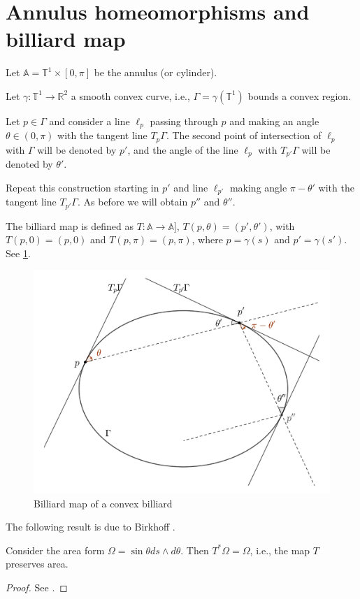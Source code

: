 \section{Annulus homeomorphisms and billiard map}

Let $\mathbb{ A}=\mathbb{T}^1\times [0,\pi]$ be the annulus (or cylinder).

Let $\gamma:\mathbb{T}^1\to\mathbb{R}^2$ a smooth convex curve, i.e., $\Gamma=\gamma(\mathbb{T}^1)$ bounds a convex region. 

 

Let $p\in \Gamma$ and consider a line $\ell_p$ passing through $p$ and making an angle $\theta\in (0,\pi)$ with the tangent line $T_p\Gamma$. The second point of intersection of $\ell_p$ with $\Gamma$ will be denoted by $p'$, and the angle of the line $\ell_p$  with $T_{p'}\Gamma$ will be denoted by $\theta'$.

Repeat this construction starting in $p'$ and   line $\ell_{p'}$ making angle $\pi-\theta'$ with the tangent line $T_{p'}\Gamma$. As before we will obtain $p''$ and $\theta''$. 

The billiard map is defined as
$T:\mathbb{A} \to\mathbb{A}]$,  $T(p,\theta)= (p',\theta')$, with $T(p,0)=(p,0)$ and $T(p,\pi)=(p,\pi)$, where $p=\gamma(s)$ and $p'=\gamma(s')$. See \cref{fig:appC-billiard-map}.
\begin{figure}
    \centering
    \includegraphics[scale=0.4]{zappC/pics/pics_appC_160bilharmapanel.pdf}
    \caption{Billiard map of a convex billiard}
    \label{fig:appC-billiard-map}
\end{figure}

The following result is due to Birkhoff \cite{birkhoff1922}.

\begin{theorem} Consider the area form $\Omega=\sin\theta ds\wedge d\theta$. Then $T^{*}\Omega=\Omega$, i.e., the map $T$ preserves area.
\end{theorem}

\begin{proof} See \cite{sergei2002}.\end{proof}

